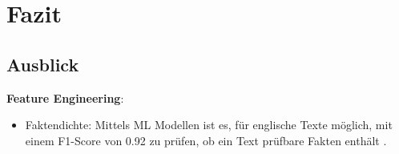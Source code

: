 
\chapter{Fazit} \label{ch:conclusion}

\section{Ausblick} \label{sec:outlook}

\textbf{Feature Engineering}:

\begin{itemize}
    \item Faktendichte: Mittels \ac{ML} Modellen ist es, für englische Texte möglich, mit einem F1-Score von \num{0.92} zu prüfen, ob ein Text prüfbare Fakten enthält \autocite{jha_towards_2023}.
\end{itemize}

